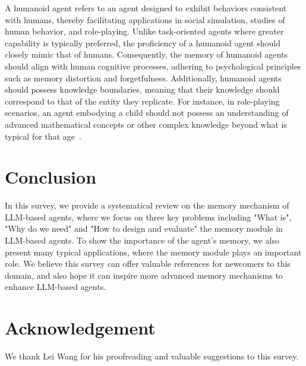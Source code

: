 \documentclass{article}
\theoremstyle{definition}
\theoremstyle{theorem}
\theoremstyle{proof}
\theoremstyle{remark}
\begin{document}
	A humanoid agent refers to an agent designed to exhibit behaviors consistent with humans, thereby facilitating applications in social simulation, studies of human behavior, and role-playing. Unlike task-oriented agents where greater capability is typically preferred, the proficiency of a humanoid agent should closely mimic that of humans. Consequently, the memory of humanoid agents should align with human cognitive processes, adhering to psychological principles such as memory distortion and forgetfulness. Additionally, humanoid agents should possess knowledge boundaries, meaning that their knowledge should correspond to that of the entity they replicate. For instance, in role-playing scenarios, an agent embodying a child should not possess an understanding of advanced mathematical concepts or other complex knowledge beyond what is typical for that age~\cite{aher2023using}.
	
	\section{Conclusion}
	\label{sec:conclusion}
	
	In this survey, we provide a systematical review on the memory mechanism of LLM-based agents, where we focus on three key problems including "What is", "Why do we need" and "How to design and evaluate" the memory module in LLM-based agents. 
	To show the importance of the agent's memory, we also present many typical applications, where the memory module plays an important role.
	We believe this survey can offer valuable references for newcomers to this domain, and also hope it can inspire more advanced memory mechanisms to enhance LLM-based agents.
	
	
	\section*{Acknowledgement}
	We thank Lei Wang for his proofreading and valuable suggestions to this survey.
	
	
	
	
	
	
	
	
\end{document}
